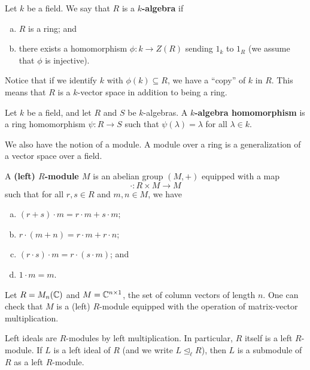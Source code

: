 \begin{defn}
Let $k$ be a field. We say that $R$ is a {\bf $k$-algebra} if 
\begin{enumerate}[(a)]
    \item $R$ is a ring; and 
    \item there exists a homomorphism $\phi : k \to Z(R)$ sending $1_k$ to $1_R$ (we assume that $\phi$ is injective).
\end{enumerate}
\end{defn}

Notice that if we identify $k$ with $\phi(k) \subseteq R$, we have a ``copy'' of $k$ in $R$. This 
means that $R$ is a $k$-vector space in addition to being a ring. 

\begin{defn}
Let $k$ be a field, and let $R$ and $S$ be $k$-algebras.
A {\bf $k$-algebra homomorphism} is a ring homomorphism $\psi : R \to S$ such that $\psi(\lambda) = \lambda$ for all 
$\lambda \in k$. 
\end{defn}

We also have the notion of a module. A module over a ring is a generalization of a 
vector space over a field. 

\begin{defn}
A {\bf (left) $R$-module $M$} is an abelian group $(M, +)$ equipped with a map 
\[ \cdot : R \times M \to M \] 
such that for all $r, s \in R$ and $m, n \in M$, we have 
\begin{enumerate}[(a)]
    \item $(r + s) \cdot m = r \cdot m + s \cdot m$; 
    \item $r \cdot (m + n) = r \cdot m + r \cdot n$;
    \item $(r \cdot s) \cdot m = r \cdot (s \cdot m)$; and 
    \item $1 \cdot m = m$.
\end{enumerate}
\end{defn}

\begin{exmp}
Let $R = M_n(\mathbb{C})$ and $M = \mathbb{C}^{n \times 1}$, the set of column vectors of length $n$. One can check that 
$M$ is a (left) $R$-module equipped with the operation of matrix-vector multiplication.
\end{exmp}

\begin{exmp}
Left ideals are $R$-modules by left multiplication. In particular, $R$ itself is a left $R$-module. If 
$L$ is a left ideal of $R$ (and we write $L \trianglelefteq_\ell R$), then $L$ is a 
submodule of $R$ as a left $R$-module.
\end{exmp}

